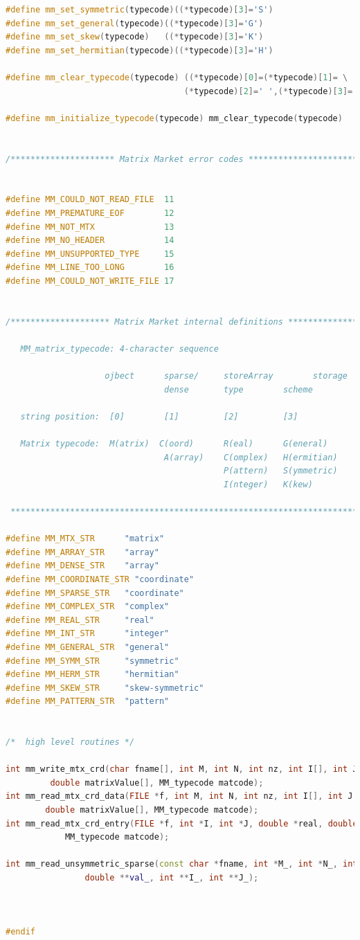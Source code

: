 \documentclass{scrreprt}
\begin{document}
\begin{lstlisting}[language=C++, caption=mmio.h]
#define mm_set_symmetric(typecode)((*typecode)[3]='S')
#define mm_set_general(typecode)((*typecode)[3]='G')
#define mm_set_skew(typecode)	((*typecode)[3]='K')
#define mm_set_hermitian(typecode)((*typecode)[3]='H')

#define mm_clear_typecode(typecode) ((*typecode)[0]=(*typecode)[1]= \
									(*typecode)[2]=' ',(*typecode)[3]='G')

#define mm_initialize_typecode(typecode) mm_clear_typecode(typecode)


/********************* Matrix Market error codes ***************************/


#define MM_COULD_NOT_READ_FILE	11
#define MM_PREMATURE_EOF		12
#define MM_NOT_MTX				13
#define MM_NO_HEADER			14
#define MM_UNSUPPORTED_TYPE		15
#define MM_LINE_TOO_LONG		16
#define MM_COULD_NOT_WRITE_FILE	17


/******************** Matrix Market internal definitions ********************

   MM_matrix_typecode: 4-character sequence

				    ojbect 		sparse/   	storeArray        storage 
						  		dense     	type        scheme

   string position:	 [0]        [1]			[2]         [3]

   Matrix typecode:  M(atrix)  C(oord)		R(eal)   	G(eneral)
						        A(array)	C(omplex)   H(ermitian)
											P(attern)   S(ymmetric)
								    		I(nteger)	K(kew)

 ***********************************************************************/

#define MM_MTX_STR		"matrix"
#define MM_ARRAY_STR	"array"
#define MM_DENSE_STR	"array"
#define MM_COORDINATE_STR "coordinate" 
#define MM_SPARSE_STR	"coordinate"
#define MM_COMPLEX_STR	"complex"
#define MM_REAL_STR		"real"
#define MM_INT_STR		"integer"
#define MM_GENERAL_STR  "general"
#define MM_SYMM_STR		"symmetric"
#define MM_HERM_STR		"hermitian"
#define MM_SKEW_STR		"skew-symmetric"
#define MM_PATTERN_STR  "pattern"


/*  high level routines */

int mm_write_mtx_crd(char fname[], int M, int N, int nz, int I[], int J[],
		 double matrixValue[], MM_typecode matcode);
int mm_read_mtx_crd_data(FILE *f, int M, int N, int nz, int I[], int J[],
		double matrixValue[], MM_typecode matcode);
int mm_read_mtx_crd_entry(FILE *f, int *I, int *J, double *real, double *img,
			MM_typecode matcode);

int mm_read_unsymmetric_sparse(const char *fname, int *M_, int *N_, int *nz_,
                double **val_, int **I_, int **J_);



#endif




\end{lstlisting}
\end{document}
